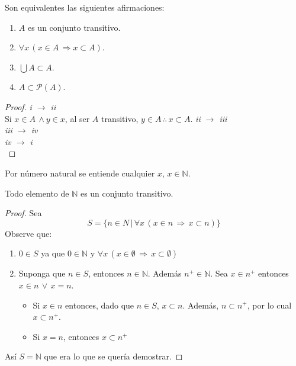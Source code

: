     \begin{remark}
        Son equivalentes las siguientes afirmaciones:
        \begin{enumerate}
            \item $A$ es un conjunto transitivo.
            \item $\forall  x \, (x \in A \, \Rightarrow x \subset A)$.
            \item $ \bigcup A \subset A $.
            \item $ A \subset \mathcal{P}(A)$.
        \end{enumerate}
    \end{remark}
    \begin{proof}
        \textit{i $\rightarrow$ ii} \\
        Si $x \in A \, \land y \in x$, al ser $A$ transitivo, $y \in A \,
        \therefore \, x \subset A$.
        \textit{ii $\rightarrow$ iii} \\
        \textit{iii $\rightarrow$ iv} \\
        \textit{iv $\rightarrow$ i} \\
    \end{proof}
    \begin{definition}
        Por número natural se entiende cualquier $x$, $x \in \mathbb{N}$.
    \end{definition}
    \begin{lemma}\label{lem:p1l1}
        Todo elemento de $\mathbb{N}$ es un conjunto transitivo.
    \end{lemma}
    \begin{proof}
        Sea 
        \[
            S = \{n \in N \, | \, \forall x \, (x \in n \, \Rightarrow \, x
            \subset n)\}
        \]
        Observe que:
        \begin{enumerate}
            \item $0 \in S$ ya que $0 \in \mathbb{N}$ y $\forall x \, ( x \in \emptyset
                \, \Rightarrow \, x \subset \emptyset )$
            \item Suponga que $n \in S$, entonces $n \in \mathbb{N}$. Además
                $n^+ \in \mathbb{N}$. Sea $x \in n^+$ entonces $x \in n \, \lor
                \, x = n$. 
                \begin{itemize}
                    \item Si $x \in n$ entonces, dado que $n \in S$, $x \subset
                        n$. Además, $n \subset n^+$, por lo cual $x \subset
                        n^+$.
                    \item Si $x=n$, entonces $x \subset n^+$
                \end{itemize}
        \end{enumerate}
        Así $S = \mathbb{N}$ que era lo que se quería demostrar.

    \end{proof}
